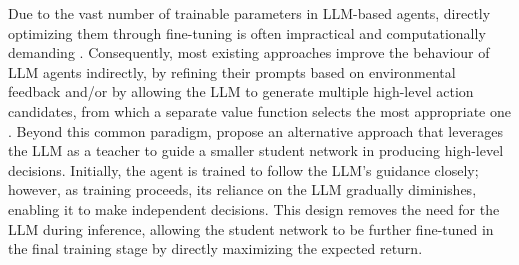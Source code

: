 
Due to the vast number of trainable parameters in LLM-based agents, directly optimizing them through fine-tuning is often impractical and computationally demanding \citep{HuHLKITYXYL2024,SchoeppJCYAGSZT2025}. Consequently, most existing approaches improve the behaviour of LLM agents indirectly, by refining their prompts based on environmental feedback and/or by allowing the LLM to generate multiple high-level action candidates, from which a separate value function selects the most appropriate one \citep{AhnBBCC2022, WangCaiCLJLM2023}. Beyond this common paradigm, \citet{ZhouHZZL2024,LiPSFXZ2026} propose an alternative approach that leverages the LLM as a teacher to guide a smaller student network in producing high-level decisions. Initially, the agent is trained to follow the LLM's guidance closely; however, as training proceeds, its reliance on the LLM gradually diminishes, enabling it to make independent decisions. This design removes the need for the LLM during inference, allowing the student network to be further fine-tuned in the final training stage by directly maximizing the expected return. 




